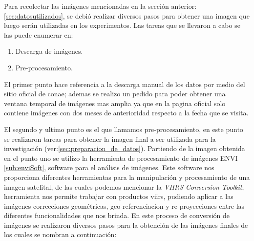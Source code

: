 Para recolectar las imágenes mencionadas en la sección anterior: \ref{sec:datosutilizados}, se debió realizar diversos pasos para obtener una imagen que luego serán utilizadas en los experimentos. Las tareas que se llevaron a cabo se las puede enumerar en:
\begin{enumerate}
	\item Descarga de imágenes.
	\item Pre-procesamiento.
\end{enumerate}

El primer punto hace referencia a la descarga manual de los datos por medio del sitio oficial de \ac{conae}; ademas se realizo un pedido para poder obtener una ventana temporal de imágenes mas amplia ya que en la pagina oficial solo contiene imágenes con dos meses de anterioridad respecto a la fecha que se visita.

El segundo y ultimo punto es el que llamamos pre-procesamiento, en este punto se realizaron tareas para obtener la imagen final a ser utilizada para la investigación (ver:\ref{sec:preparacion_de_datos}).
Partiendo de la imagen obtenida en el punto uno se utilizo la herramienta de procesamiento de imágenes ENVI \ref{sub:enviSoft}, software para el análisis de imágenes. Este software nos proporciona diferentes herramientas para la manipulación y procesamiento  de  una imagen satelital, de las cuales podemos mencionar la \textit{VIIRS Conversion Toolkit}; herramienta nos permite trabajar con productos \ac{viirs}, pudiendo aplicar a las imágenes correcciones geométricas, geo-referenciacion y re-proyecciones entre las diferentes funcionalidades que nos brinda. En este proceso de conversión de imágenes se realizaron diversos pasos para la obtención de las imágenes finales de los cuales se nombran a continuación:


